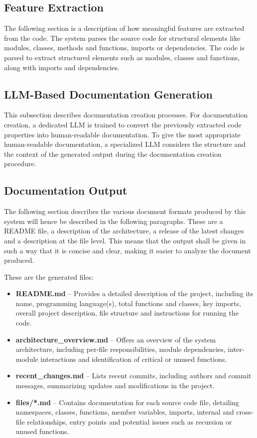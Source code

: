 \subsection{Feature Extraction}
\hspace{0.5cm}
The following section is a description of how meaningful features are extracted from the code. The system parses the source code for structural elements like modules, classes, methods and functions, imports or dependencies. The code is parsed to extract structured elements such as modules, classes and functions, along with imports and dependencies. 

\subsection{LLM-Based Documentation Generation}
\hspace{0.5cm}
This subsection describes documentation creation processes. For documentation creation, a dedicated LLM is trained to convert the previously extracted code properties into human-readable documentation. To give the most appropriate human-readable documentation, a specialized LLM considers the structure and the context of the generated output during the documentation creation procedure. 

\subsection{Documentation Output}
\hspace{0.5cm}
The following section describes the various document formats produced by this system will hence be described in the following paragraphs. These are a README file, a description of the architecture, a release of the latest changes and a description at the file level. This means that the output shall be given in such a way that it is concise and clear, making it easier to analyze the document produced. 

These are the generated files:
\begin{itemize}
\item \textbf{README.md} – Provides a detailed description of the project, including its name, programming language(s), total functions and classes, key imports, overall project description, file structure and instructions for running the code.
\item \textbf{architecture\_overview.md} – Offers an overview of the system architecture, including per-file responsibilities, module dependencies, inter-module interactions and identification of critical or unused functions.
\item \textbf{recent\_changes.md} – Lists recent commits, including authors and commit messages, summarizing updates and modifications in the project.
\item \textbf{files/*.md} – Contains documentation for each source code file, detailing namespaces, classes, functions, member variables, imports, internal and cross-file relationships, entry points and potential issues such as recursion or unused functions.
\end{itemize}


